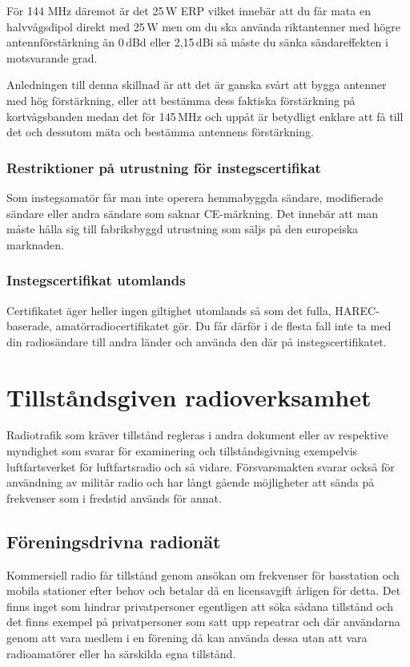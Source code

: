 För 144 MHz däremot är det 25\,W ERP vilket innebär att du får mata en
halvvågsdipol direkt med 25\,W men om du ska använda riktantenner med högre
antennförstärkning än 0\,dBd eller 2,15\,dBi så måste du sänka sändareffekten i
motsvarande grad.

Anledningen till denna skillnad är att det är ganska svårt att bygga antenner
med hög förstärkning, eller att bestämma dess faktiska förstärkning på
kortvågsbanden medan det för 145\,MHz och uppåt är betydligt enklare att få till
det och dessutom mäta och bestämma antennens förstärkning.

\subsubsection{Restriktioner på utrustning för instegscertifikat}

Som instegsamatör får man inte operera hemmabyggda sändare, modifierade sändare
eller andra sändare som saknar CE-märkning. Det innebär att man måste hålla sig
till fabriksbyggd utrustning som säljs på den europeiska marknaden.

\subsubsection{Instegscertifikat utomlands}

Certifikatet äger heller ingen giltighet utomlands så som det fulla,
HAREC-baserade, amatörradiocertifikatet gör. Du får därför i de flesta fall inte
ta med din radiosändare till andra länder och använda den där på
instegscertifikatet.

\section{Tillståndsgiven radioverksamhet}

Radiotrafik som kräver tillstånd regleras i andra dokument eller av respektive
myndighet som svarar för examinering och tillståndsgivning exempelvis
luftfartsverket för luftfartsradio och så vidare. Försvarsmakten svarar också
för användning av militär radio och har långt gående möjligheter att sända på
frekvenser som i fredstid används för annat.

\subsection{Föreningsdrivna radionät}

Kommersiell radio får tillstånd genom ansökan om frekvenser för basstation och
mobila stationer efter behov och betalar då en licensavgift årligen för
detta. Det finns inget som hindrar privatpersoner egentligen att söka sådana
tillstånd och det finns exempel på privatpersoner som satt upp repeatrar och där
användarna genom att vara medlem i en förening då kan använda dessa utan att
vara radioamatörer eller ha särskilda egna tillstånd.


